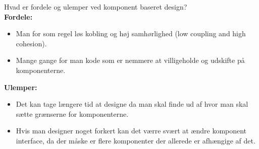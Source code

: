 Hvad er fordele og ulemper ved komponent baseret design? \\
\textbf{Fordele:}
\begin{itemize}
    \item Man for som regel løs kobling og høj samhørlighed (low coupling and
        high cohesion).
    \item Mange gange for man kode som er nemmere at villigeholde og udskifte
        på komponenterne.
\end{itemize}

\textbf{Ulemper:}
\begin{itemize}
    \item Det kan tage længere tid at designe da man skal finde ud af hvor man
    skal sætte grænserne for komponenterne.  
    \item Hvis man designer noget
        forkert kan det værre svært at ændre komponent interface, da der måske
        er flere komponenter der allerede er afhængige af det.
\end{itemize}
